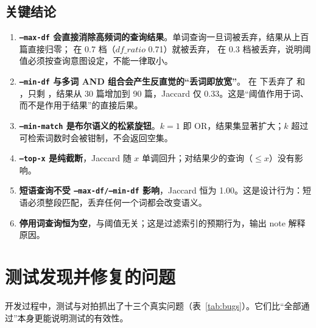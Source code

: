\subsection{关键结论}

\begin{enumerate}
  \item \textbf{\texttt{--max-df} 会直接消除高频词的查询结果}。单词查询一旦词被丢弃，结果从上百篇直接归零； 在 0.7 档（$df\_ratio$ 0.71）就被丢弃， 在 0.3 档被丢弃，说明阈值必须按查询意图设定，不能一律取小。
  \item \textbf{\texttt{--min-df} 与多词 AND 组合会产生反直觉的“丢词即放宽”}。 在  下丢弃了  和 ，只剩 ，结果从 30 篇增加到 90 篇，Jaccard 仅 0.33。这是“阈值作用于词、而不是作用于结果”的直接后果。
  \item \textbf{\texttt{--min-match} 是布尔语义的松紧旋钮}。$k=1$ 即 OR，结果集显著扩大；$k$ 超过可检索词数时会被钳制，不会返回空集。
  \item \textbf{\texttt{--top-x} 是纯截断}，Jaccard 随 $x$ 单调回升；对结果少的查询（$\le x$）没有影响。
  \item \textbf{短语查询不受 \texttt{--max-df/--min-df} 影响}，Jaccard 恒为 1.00。这是设计行为：短语必须整段匹配，丢弃任何一个词都会改变语义。
  \item \textbf{停用词查询恒为空}，与阈值无关；这是过滤索引的预期行为，输出 note 解释原因。
\end{enumerate}

\section{测试发现并修复的问题}

开发过程中，测试与对拍抓出了十三个真实问题（表~\ref{tab:bugs}）。它们比“全部通过”本身更能说明测试的有效性。


